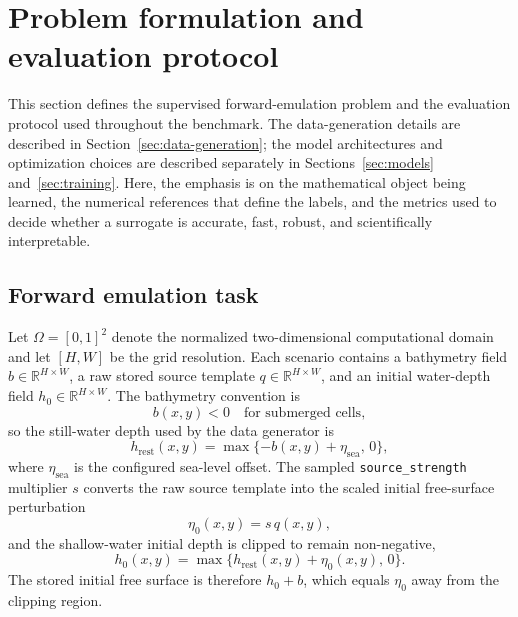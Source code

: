 \section{Problem formulation and evaluation protocol}
\label{sec:methods}

This section defines the supervised forward-emulation problem and the evaluation protocol used throughout the benchmark. The data-generation details are described in Section~\ref{sec:data-generation}; the model architectures and optimization choices are described separately in Sections~\ref{sec:models} and~\ref{sec:training}. Here, the emphasis is on the mathematical object being learned, the numerical references that define the labels, and the metrics used to decide whether a surrogate is accurate, fast, robust, and scientifically interpretable.

\subsection{Forward emulation task}
\label{subsec:forward-task}
Let $\Omega=[0, 1]^2$ denote the normalized two-dimensional computational domain and let $[H, W]$ be the grid resolution. Each scenario contains a bathymetry field $b\in\mathbb{R}^{H \times W}$, a raw stored source template $q \in\mathbb{R}^{H \times W}$, and an initial water-depth field $h_0 \in\mathbb{R}^{H \times W}$. The bathymetry convention is
\[
b(x, y) < 0 \quad \text {for submerged cells},
\]
so the still-water depth used by the data generator is
\[
h_{\mathrm{rest}}(x, y) = \max\{-b(x, y) + \eta_{\mathrm{sea}},\, 0\},
\]
where $\eta_{\mathrm{sea}}$ is the configured sea-level offset. The sampled \texttt{source\_strength} multiplier $s$ converts the raw source template into the scaled initial free-surface perturbation
\[
\eta_0(x, y) = s\, q(x, y),
\]
and the shallow-water initial depth is clipped to remain non-negative,
\[
h_0(x, y) = \max\{h_{\mathrm{rest}}(x, y) + \eta_0(x, y),\, 0\}.
\]
The stored initial free surface is therefore $h_0 + b$, which equals $\eta_0$ away from the clipping region.

